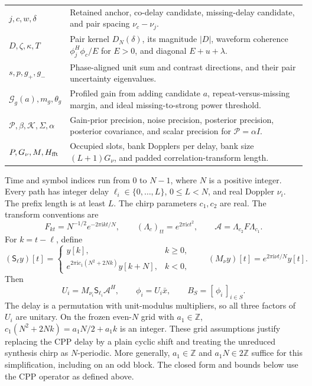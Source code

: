 \begin{center}
\begin{tabular}{@{}p{.30\linewidth}p{.65\linewidth}@{}}
$j,c,w,\delta$ &
Retained anchor, co-delay candidate, missing-delay candidate,
and pair spacing $\nu_c-\nu_j$. \\
$D,\zeta,\kappa,T$ &
Pair kernel $D_N(\delta)$, its magnitude $|D|$, waveform coherence
$\phi_j^H\phi_c/E$ for $E>0$, and diagonal $E+u+\lambda$. \\
$s,p,g_+,g_-$ &
Phase-aligned unit sum and contrast directions, and their pair
uncertainty eigenvalues. \\
$\mathcal G_g(a),m_g,\theta_g$ &
Profiled gain from adding candidate $a$, repeat-versus-missing
margin, and ideal missing-to-strong power threshold. \\
$\mathcal P,\beta,\mathcal K,\Sigma,\alpha$ &
Gain-prior precision, noise precision, posterior precision,
posterior covariance, and scalar precision for $\mathcal P=\alpha I$. \\
$P,G_\nu,M,H_{\rm fft}$ &
Occupied slots, bank Dopplers per delay, bank size $(L+1)G_\nu$,
and padded correlation-transform length. \\
\hline
\end{tabular}
\end{center}

Time and symbol indices run from $0$ to $N-1$, where $N$ is a positive
integer. Every path has integer delay $\ell_i\in\{0,\ldots,L\}$,
$0\le L<N$, and real Doppler $\nu_i$. The prefix length is at least
$L$. The chirp parameters $c_1,c_2$ are real. The transform conventions
are
\[
 F_{kt}=N^{-1/2}e^{-2\pi\mathrm{i}kt/N},\qquad
 (\Lambda_c)_{tt}=e^{2\pi\mathrm{i}ct^2},\qquad
 \mathcal A=\Lambda_{c_2}F\Lambda_{c_1}.
\]
For $k=t-\ell$, define
\[
 (\mathsf S_\ell y)[t]=
 \begin{cases}
 y[k],& k\ge0,\\
 e^{2\pi\mathrm{i}c_1(N^2+2Nk)}y[k+N],& k<0,
 \end{cases}
 \qquad
 (M_\nu y)[t]=e^{2\pi\mathrm{i}\nu t/N}y[t].
\]
Then
\[
 U_i=M_{\nu_i}\mathsf S_{\ell_i}\mathcal A^H,\qquad
 \phi_i=U_i\bar x,\qquad B_S=[\,\phi_i\,]_{i\in S}.
\]
The delay is a permutation with unit-modulus multipliers, so all three
factors of $U_i$ are unitary. On the frozen even-$N$ grid with
$a_1\in\mathbb Z$, $c_1(N^2+2Nk)=a_1N/2+a_1k$ is an integer.
These grid assumptions justify replacing the CPP delay by a plain
cyclic shift and treating the unreduced synthesis chirp as
$N$-periodic. More generally, $a_1\in\mathbb Z$ and $a_1N\in2\mathbb Z$
suffice for this simplification, including on an odd block. The
closed form and bounds below use the CPP operator as defined above.

